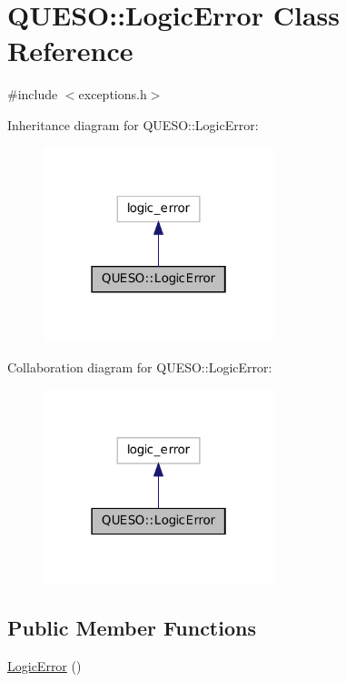\hypertarget{class_q_u_e_s_o_1_1_logic_error}{\section{Q\-U\-E\-S\-O\-:\-:Logic\-Error Class Reference}
\label{class_q_u_e_s_o_1_1_logic_error}
}


{\ttfamily \#include $<$exceptions.\-h$>$}



Inheritance diagram for Q\-U\-E\-S\-O\-:\-:Logic\-Error\-:
\nopagebreak
\begin{figure}[H]
\begin{center}
\leavevmode
\includegraphics[width=190pt]{class_q_u_e_s_o_1_1_logic_error__inherit__graph}
\end{center}
\end{figure}


Collaboration diagram for Q\-U\-E\-S\-O\-:\-:Logic\-Error\-:
\nopagebreak
\begin{figure}[H]
\begin{center}
\leavevmode
\includegraphics[width=190pt]{class_q_u_e_s_o_1_1_logic_error__coll__graph}
\end{center}
\end{figure}
\subsection*{Public Member Functions}
\begin{DoxyCompactItemize}
\item 
\hyperlink{class_q_u_e_s_o_1_1_logic_error_a9c59a149f2c8ef10d7946f843b1b5d40}{Logic\-Error} ()
\end{DoxyCompactItemize}



